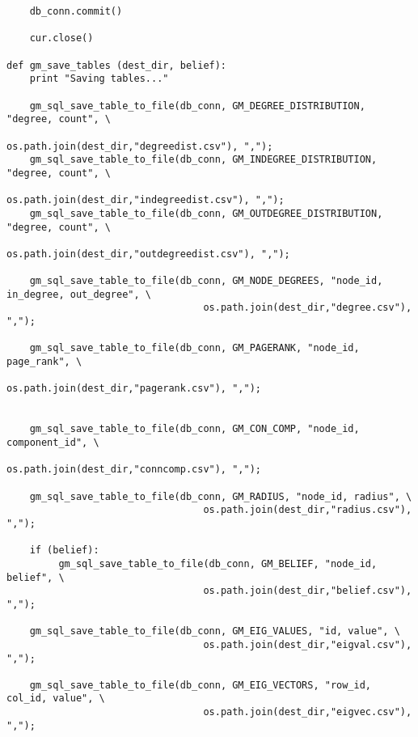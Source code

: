 \begin{lstlisting}
    db_conn.commit()

    cur.close()

def gm_save_tables (dest_dir, belief):
    print "Saving tables..."

    gm_sql_save_table_to_file(db_conn, GM_DEGREE_DISTRIBUTION, "degree, count", \
                                  os.path.join(dest_dir,"degreedist.csv"), ",");
    gm_sql_save_table_to_file(db_conn, GM_INDEGREE_DISTRIBUTION, "degree, count", \
                                  os.path.join(dest_dir,"indegreedist.csv"), ",");
    gm_sql_save_table_to_file(db_conn, GM_OUTDEGREE_DISTRIBUTION, "degree, count", \
                                  os.path.join(dest_dir,"outdegreedist.csv"), ",");

    gm_sql_save_table_to_file(db_conn, GM_NODE_DEGREES, "node_id, in_degree, out_degree", \
                                  os.path.join(dest_dir,"degree.csv"), ",");

    gm_sql_save_table_to_file(db_conn, GM_PAGERANK, "node_id, page_rank", \
                                  os.path.join(dest_dir,"pagerank.csv"), ",");


    gm_sql_save_table_to_file(db_conn, GM_CON_COMP, "node_id, component_id", \
                                  os.path.join(dest_dir,"conncomp.csv"), ",");

    gm_sql_save_table_to_file(db_conn, GM_RADIUS, "node_id, radius", \
                                  os.path.join(dest_dir,"radius.csv"), ",");

    if (belief):
         gm_sql_save_table_to_file(db_conn, GM_BELIEF, "node_id, belief", \
                                  os.path.join(dest_dir,"belief.csv"), ",");

    gm_sql_save_table_to_file(db_conn, GM_EIG_VALUES, "id, value", \
                                  os.path.join(dest_dir,"eigval.csv"), ",");

    gm_sql_save_table_to_file(db_conn, GM_EIG_VECTORS, "row_id, col_id, value", \
                                  os.path.join(dest_dir,"eigvec.csv"), ",");



\end{lstlisting}
